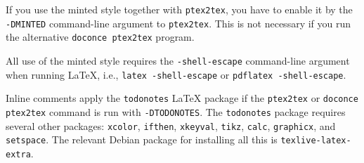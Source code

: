 \documentclass[%
oneside,                 %
final,                   %
10pt]{article}
\begin{document}
If you use the minted style together with {\fontsize{10pt}{10pt}\Verb!ptex2tex!}, you have to
enable it by the {\fontsize{10pt}{10pt}\Verb!-DMINTED!} command-line argument to {\fontsize{10pt}{10pt}\Verb!ptex2tex!}.
This is not necessary if you run the alternative {\fontsize{10pt}{10pt}\Verb!doconce ptex2tex!} program.

All use of the minted style requires the {\fontsize{10pt}{10pt}\Verb!-shell-escape!} command-line
argument when running {\LaTeX}, i.e., {\fontsize{10pt}{10pt}\Verb!latex -shell-escape!} or {\fontsize{10pt}{10pt}\Verb!pdflatex -shell-escape!}.

Inline comments apply the {\fontsize{10pt}{10pt}\Verb!todonotes!} {\LaTeX} package if the {\fontsize{10pt}{10pt}\Verb!ptex2tex!}
or {\fontsize{10pt}{10pt}\Verb!doconce ptex2tex!} command is run with {\fontsize{10pt}{10pt}\Verb!-DTODONOTES!}.  The
{\fontsize{10pt}{10pt}\Verb!todonotes!} package requires several other packages: {\fontsize{10pt}{10pt}\Verb!xcolor!},
{\fontsize{10pt}{10pt}\Verb!ifthen!}, {\fontsize{10pt}{10pt}\Verb!xkeyval!}, {\fontsize{10pt}{10pt}\Verb!tikz!}, {\fontsize{10pt}{10pt}\Verb!calc!}, {\fontsize{10pt}{10pt}\Verb!graphicx!}, and {\fontsize{10pt}{10pt}\Verb!setspace!}. The
relevant Debian package for installing all this is
{\fontsize{10pt}{10pt}\Verb!texlive-latex-extra!}.
\end{document}
